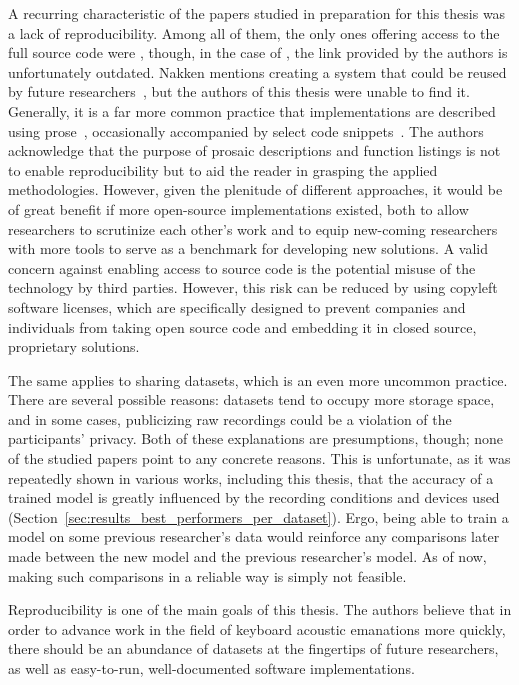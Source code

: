 \documentclass[../main.tex]{subfiles}
\begin{document}
A recurring characteristic of the papers studied in preparation for this thesis was a lack of reproducibility. Among all of them, the only ones offering access to the full source code were \cite{revisited2005, skype2017}, though, in the case of \cite{revisited2005}, the link provided by the authors is unfortunately outdated. Nakken mentions creating a system that could be reused by future researchers~\cite{nakken2023}, but the authors of this thesis were unable to find it.
Generally, it is a far more common practice that implementations are described using prose~\cite{og2004, dict2006, acloserlook2012, content_reconstruction_2014, }, occasionally accompanied by select code snippets~\cite{wit2014all, wavelet2022}. The authors acknowledge that the purpose of prosaic descriptions and function listings is not to enable reproducibility but to aid the reader in grasping the applied methodologies.
However, given the plenitude of different approaches, it would be of great benefit if more open-source implementations existed, both to allow researchers to scrutinize each other's work and to equip new-coming researchers with more tools to serve as a benchmark for developing new solutions.
A valid concern against enabling access to source code is the potential misuse of the technology by third parties. However, this risk can be reduced by using copyleft software licenses, which are specifically designed to prevent companies and individuals from taking open source code and embedding it in closed source, proprietary solutions.

The same applies to sharing datasets, which is an even more uncommon practice. There are several possible reasons: datasets tend to occupy more storage space, and in some cases, publicizing raw recordings could be a violation of the participants' privacy. Both of these explanations are presumptions, though; none of the studied papers point to any concrete reasons.
This is unfortunate, as it was repeatedly shown in various works, including this thesis, that the accuracy of a trained model is greatly influenced by the recording conditions and devices used~\cite{og2004, revisited2005} (Section~\ref{sec:results_best_performers_per_dataset}). Ergo, being able to train a model on some previous researcher's data would reinforce any comparisons later made between the new model and the previous researcher's model. As of now, making such comparisons in a reliable way is simply not feasible.

Reproducibility is one of the main goals of this thesis. The authors believe that in order to advance work in the field of keyboard acoustic emanations more quickly, there should be an abundance of datasets at the fingertips of future researchers, as well as easy-to-run, well-documented software implementations.
\end{document}
